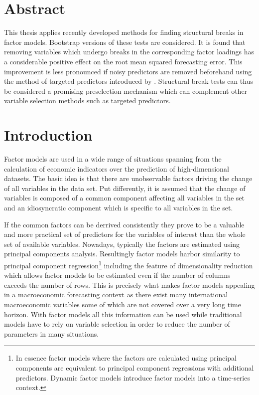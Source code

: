 \documentclass[12pt]{article}
\begin{document}
\section*{Abstract}
This thesis applies recently developed methods for finding structural breaks in factor models. Bootstrap versions of these tests are considered. It is found that removing variables which undergo breaks in the corresponding factor loadings has a considerable positive effect on the root mean squared forecasting error. This improvement is less pronounced if noisy predictors are removed beforehand using the method of targeted predictors introduced by \citet{bai2008forecasting}. Structural break tests can thus be considered a promising preselection mechanism which can complement other variable selection methods such as targeted predictors.

\section*{Introduction}
Factor models are used in a wide range of situations spanning from the calculation of economic indicators over the prediction of high-dimensional datasets. The basic idea is that there are unobservable factors driving the change of all variables in the data set. Put differently, it is assumed that the change of variables is composed of a common component affecting all variables in the set and an idiosyncratic component which is specific to all variables in the set.

If the common factors can be derrived consistently they prove to be a valuable and more practical set of predictors for the variables of interest than the whole set of available variables. Nowadays, typically the factors are estimated using principal components analysis. Resultingly factor models harbor similarity to principal component regression\footnote{In essence factor models where the factors are calculated using principal components are equivalent to principal component regressions with additional predictors. Dynamic factor models introduce factor models into a time-series context.} including the feature of dimensionality reduction which allows factor models to be estimated even if the number of columns exceeds the number of rows. This is precisely what makes factor models appealing in a macroeconomic forecasting context as there exist many international macroeconomic variables some of which are not covered over a very long time horizon. With factor models all this information can be used while traditional models have to rely on variable selection in order to reduce the number of parameters in many situations.
\end{document}
